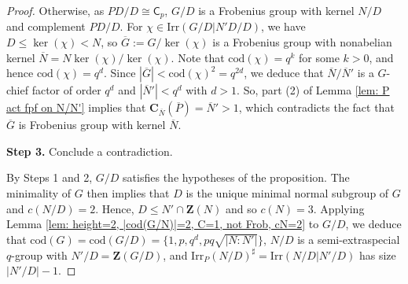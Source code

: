\documentclass[9pt]{article}
\begin{document}
\begin{proof}
  Otherwise, as $PD/D\cong \mathsf{C}_{p}$, $G/D$ is a Frobenius group with kernel $N/D$ and complement $PD/D$.
  For $\chi\in \mathrm{Irr}(G/D|N'D/D)$,
   we have $D\leq \ker(\chi)< N$,
  so $\overline{G}:=G/\ker(\chi)$ is a Frobenius group with nonabelian kernel $\overline{N}=N\ker(\chi)/\ker(\chi)$.
  Note that $\mathrm{cod}(\chi)=q^{k}$ for some $k>0$,
  and hence $\mathrm{cod}(\chi)=q^{d}$. 
 Since $|\overline{G}|<\mathrm{cod}(\chi)^{2}=q^{2d}$,
	we deduce that $\overline{N}/\overline{N}'$ is a $G$-chief factor of order $q^{d}$
	and $|\overline{N}'|<q^{d}$ with $d>1$.
	So, part (2) of Lemma \ref{lem: P act fpf on N/N'} implies that $\mathbf{C}_{\overline{N}}(\overline{P})=\overline{N}'>1$,
	which contradicts the fact that $\overline{G}$ is Frobenius group with kernel $\overline{N}$.
 
	\textbf{Step 3.} Conclude a contradiction.
	
	
 
	 

	



    By Steps 1 and 2, $G/D$ satisfies the hypotheses of the proposition.
    The minimality of $G$ then implies that $D$ is the unique minimal normal subgroup of $G$ and $c(N/D)=2$.
	Hence, $D\leq N'\cap\mathbf{Z}(N)$ and so $c(N)=3$. 
	Applying Lemma \ref{lem: height=2, |cod(G/N)|=2, C=1, not Frob, cN=2} to $G/D$,
	we deduce that 
	$\mathrm{cod}(G)=\mathrm{cod}(G/D)=\{ 1,p,q^{d},pq\sqrt{|N:N'|} \}$, $N/D$ is a semi-extraspecial $q$-group with $N'/D=\mathbf{Z}(G/D)$, and $\mathrm{Irr}_{P}(N/D)^\sharp=\mathrm{Irr}(N/D|N'/D)$ has size $|N'/D|-1$.



  
 
  



\end{proof}
\end{document}
